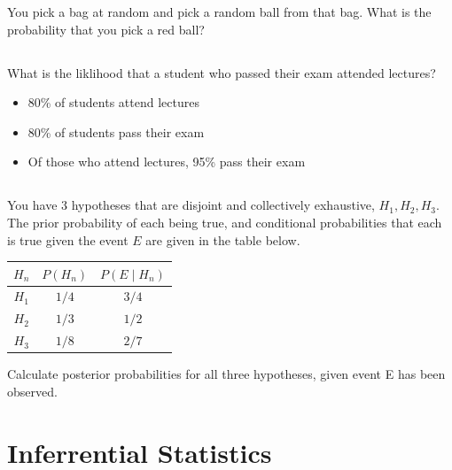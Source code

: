 \documentclass[twocolumn]{article}
\begin{document}
    You pick a bag at random and pick a random ball from that bag. What is the probability that you pick a red ball?

\subsection{}

    What is the liklihood that a student who passed their exam attended lectures?

    \begin{itemize}
        \item 80\% of students attend lectures
        \item 80\% of students pass their exam
        \item Of those who attend lectures, 95\% pass their exam
    \end{itemize}
    
\subsection{}

    You have 3 hypotheses that are disjoint and collectively exhaustive, $H_1, H_2, H_3$. The prior probability of each being true, and conditional probabilities that each is true given the event $E$ are given in the table below.

    \begin{table}[h!]
        \centering
        \begin{tabular}{c | c | c }
            \toprule
            $H_n$ & $P(H_n)$ & $P(E \mid H_n)$ \\
            \midrule
            $H_1$ & ${1}/{4}$ & ${3}/{4}$  \\
            $H_2$ & ${1}/{3}$ & ${1}/{2}$  \\
            $H_3$ & ${1}/{8}$ & ${2}/{7}$ \\
            \bottomrule
        \end{tabular}
    \end{table}

    Calculate posterior probabilities for all three hypotheses, given event E has been observed.


\clearpage
\section{Inferrential Statistics}

\subsection{}
\end{document}
